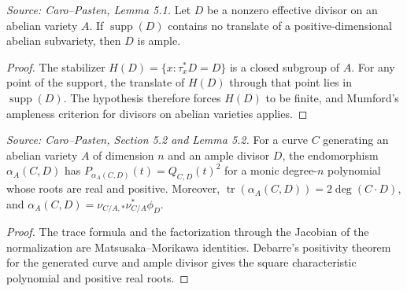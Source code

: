 \begin{lemma}
  \label{lem:cp_ample_abvar_divisor}
  \textit{Source: Caro--Pasten, Lemma 5.1.}
  Let \(D\) be a nonzero effective divisor on an abelian variety \(A\).  If
  \(\operatorname{supp}(D)\) contains no translate of a positive-dimensional
  abelian subvariety, then \(D\) is ample.
\end{lemma}
\begin{proof}
  The stabilizer \(H(D)=\{x:\tau_x^*D=D\}\) is a closed subgroup of \(A\).
  For any point of the support, the translate of \(H(D)\) through that point
  lies in \(\operatorname{supp}(D)\).  The hypothesis therefore forces
  \(H(D)\) to be finite, and Mumford's ampleness criterion for divisors on
  abelian varieties applies.
\end{proof}

\begin{lemma}
  \label{lem:cp_abvar_degree_trace_package}
  \textit{Source: Caro--Pasten, Section 5.2 and Lemma 5.2.}
  For a curve \(C\) generating an abelian variety \(A\) of dimension \(n\) and
  an ample divisor \(D\), the endomorphism \(\alpha_A(C,D)\) has
  \(P_{\alpha_A(C,D)}(t)=Q_{C,D}(t)^2\) for a monic degree-\(n\) polynomial
  whose roots are real and positive.  Moreover,
  \(\operatorname{tr}(\alpha_A(C,D))=2\deg(C\cdot D)\), and
  \(\alpha_A(C,D)=\nu_{C/A,*}\nu_{C/A}^*\phi_D\).
\end{lemma}
\begin{proof}
  The trace formula and the factorization through the Jacobian of the
  normalization are Matsusaka--Morikawa identities.  Debarre's positivity
  theorem for the generated curve and ample divisor gives the square
  characteristic polynomial and positive real roots.
\end{proof}

